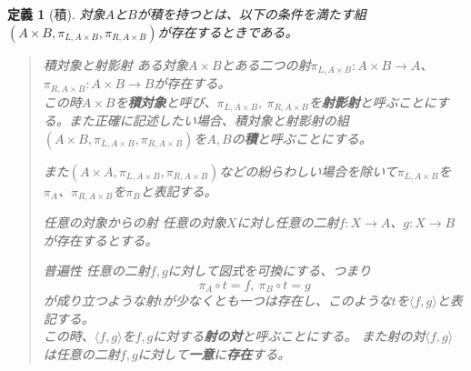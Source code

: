 \documentclass[uplatex,dvipdfmx]{jsarticle}
\newcommand{\arrow}{\rightarrow}
\newcommand{\tuple}[1]{\langle #1\rangle}
\newcommand{\mor}[3]{#1:#2\arrow #3}
\newtheorem{define}[proof]{定義}
\numberwithin{proof}{subsection}
\newenvironment{mydescription}
{\begin{description}
  \setlength{\parskip}{0.5cm}
}
{\end{description}}
\begin{document}
	\begin{define}[積]
		対象$A$と$B$が積を持つとは、以下の条件を満たす組$(A\times B,\pi_{L,A\times B},\pi_{R,A\times B})$が存在するときである。
		\begin{quote}
			\begin{mydescription}
			\item[積対象と射影射]ある対象$A\times B$とある二つの射$\mor{\pi_{L,A\times B}}{A\times B}{A}$、$\mor{\pi_{R,A\times B}}{A\times B}{B}$が存在する。\\
      この時$A\times B$を\textbf{積対象}と呼び、$\pi_{L,A\times B},\ \pi_{R,A\times B}$を\textbf{射影射}と呼ぶことにする。また正確に記述したい場合、積対象と射影射の組$(A\times B,\pi_{L,A\times B},\pi_{R,A\times B})$を$A,B$の\textbf{積}と呼ぶことにする。

			\begin{center}
			\end{center}
			また$(A\times A,\pi_{L,A\times B},\pi_{R,A\times B})$などの紛らわしい場合を除いて$\pi_{L,A\times B}$を$\pi_A$、$\pi_{R,A\times B}$を$\pi_B$と表記する。
			\item[任意の対象からの射]任意の対象$X$に対し任意の二射$\mor{f}{X}{A}$、$\mor{g}{X}{B}$が存在するとする。
			\begin{center}
			\end{center}
			\item[普遍性]任意の二射$f,g$に対して図式を可換にする、つまり\[\pi_A\circ t=f,\ \pi_B\circ t=g\]が成り立つような射$t$が少なくとも一つは存在し、このような$t$を$\tuple{f,g}$と表記する。\\
      この時、$\tuple{f,g}$を$f,g$に対する\textbf{射の対}と呼ぶことにする。
			また射の対$\tuple{f,g}$は任意の二射$f,g$に対して\textbf{一意}に\textbf{存在}する。\\

\end{mydescription}
\end{quote}
\end{define}
\end{document}

